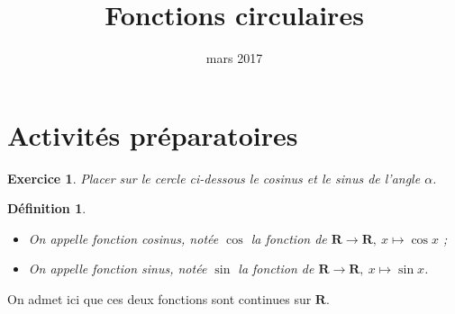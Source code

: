 \documentclass[11pt,a4paper,french]{article}
\title{Fonctions circulaires}
\author{\bsc{Jumel}}
\date{mars 2017}
\makeatletter
\renewcommand{\maketitle}%
{\framebox{%
    \begin{minipage}{1.0\linewidth}%
      \begin{center}%
        \Large \@title ~-- \@author \\%
        \@date%
      \end{center}%
    \end{minipage}}%
  \normalsize%
}
\newcommand{\R}{\mathbf{R}}
\theoremstyle{break}
\newtheorem{definition}{Définition}
\theoremstyle{plain}
\newtheorem{exerciceT}{Exercice}
\theoremstyle{nonumberplain}
\theoremstyle{nonumberbreak}
\newenvironment{exercice}{\begin{framed}\begin{exerciceT}}{\end{exerciceT}\end{framed}}
\makeatother
\begin{document}
\noindent\maketitle

\bigskip

\section*{Activités préparatoires}

\begin{exercice}
  Placer sur le cercle ci-dessous le cosinus et le sinus de l'angle
  $\alpha$.

  \begin{center}
  \end{center}
\end{exercice}

\begin{definition}
  \begin{itemize}
    \item On appelle fonction cosinus, notée $\cos$ la fonction de $\R
      \to \R,\ x\mapsto \cos x$ ;
    \item On appelle fonction sinus, notée $\sin$ la fonction de $\R \to
      \R,\ x\mapsto \sin x$.
  \end{itemize}
\end{definition}

On admet ici que ces deux fonctions sont continues sur $\R$.
\end{document}
